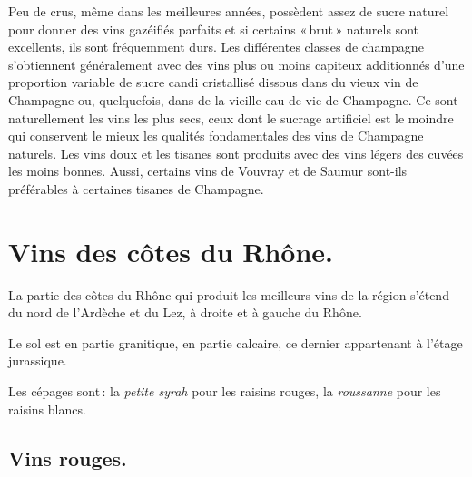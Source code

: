 Peu de crus, même dans les meilleures années, possèdent assez de sucre naturel
pour donner des vins gazéifiés parfaits et si certains « brut » naturels sont
excellents, ils sont fréquemment durs. Les différentes classes de champagne
s'obtiennent généralement avec des vins plus ou moins capiteux additionnés
d'une proportion variable de sucre candi cristallisé dissous dans du vieux vin
de Champagne ou, quelquefois, dans de la vieille eau-de-vie de Champagne. Ce
sont naturellement les vins les plus secs, ceux dont le sucrage artificiel est
le moindre qui conservent le mieux les qualités fondamentales des vins de
Champagne naturels. Les vins doux et les tisanes sont produits avec des vins
légers des cuvées les moins bonnes. Aussi, certains vins de Vouvray et de
Saumur sont-ils préférables à certaines tisanes de Champagne.

\section*{\centering Vins des côtes du Rhône.}

La partie des côtes du Rhône qui produit les meilleurs vins de la région
s'étend du nord de l'Ardèche et du Lez, à droite et à gauche du Rhône.

Le sol est en partie granitique, en partie calcaire, ce dernier appartenant à
l'étage jurassique.

Les cépages sont : la \textit{petite syrah} pour les raisins rouges, la
\textit{roussanne} pour les raisins blancs.

\subsection*{\centering \small\sc Vins rouges.}

